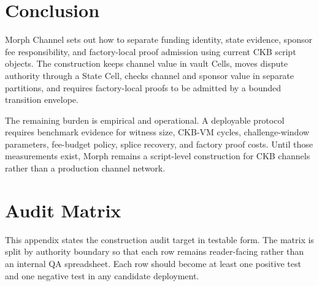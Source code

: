 \documentclass[a4paper,11pt]{article}
\begin{document}
\clearpage
\section{Conclusion}

Morph Channel sets out how to separate funding identity, state evidence, sponsor
fee responsibility, and factory-local proof admission using current CKB script
objects. The construction keeps channel value in vault Cells, moves dispute
authority through a State Cell, checks channel and sponsor value in separate
partitions, and requires factory-local proofs to be admitted by a bounded
transition envelope.

The remaining burden is empirical and operational. A deployable protocol requires
benchmark evidence for witness size, CKB-VM cycles, challenge-window
parameters, fee-budget policy, splice recovery, and factory proof costs. Until
those measurements exist, Morph remains a script-level construction for CKB
channels rather than a production channel network.

\appendix

\clearpage
\section{Audit Matrix}
\label{app:audit-matrix}

This appendix states the construction audit target in testable form. The matrix
is split by authority boundary so that each row remains reader-facing rather
than an internal QA spreadsheet. Each row should become at least one positive
test and one negative test in any candidate deployment.
\end{document}
